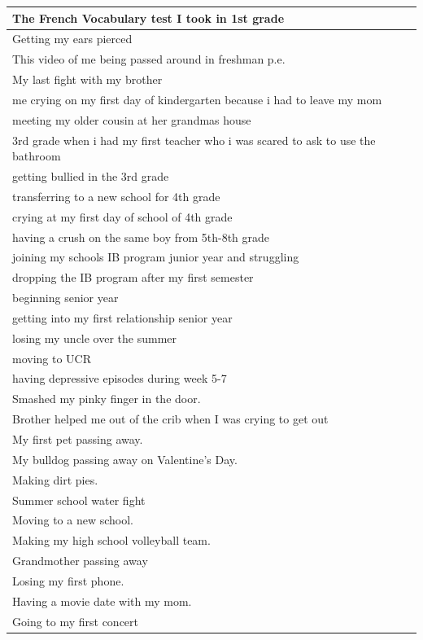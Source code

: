 \documentclass[
  .7em,
  letterpaper,
  DIV=11,
  numbers=noendperiod]{scrartcl}
\begin{document}
\begin{table}
\begin{tabular}{l}
\hline
The French Vocabulary test I took in 1st grade\\
\hline
Getting my ears pierced\\
\hline
This video of me being passed around in freshman p.e.\\
\hline
My last fight with my brother\\
\hline
me crying on my first day of kindergarten because i had to leave my mom\\
\hline
meeting my older cousin at her grandmas house\\
\hline
3rd grade when i had my first teacher who i was scared to ask to use the bathroom\\
\hline
getting bullied in the 3rd grade\\
\hline
transferring to a new school for 4th grade\\
\hline
crying at my first day of school of 4th grade\\
\hline
having a crush on the same boy from 5th-8th grade\\
\hline
joining my schools IB program junior year and struggling\\
\hline
dropping the IB program after my first semester\\
\hline
beginning senior year\\
\hline
getting into my first relationship senior year\\
\hline
losing my uncle over the summer\\
\hline
moving to UCR\\
\hline
having depressive episodes during week 5-7\\
\hline
Smashed my pinky finger in the door.\\
\hline
Brother helped me out of the crib when I was crying to get out\\
\hline
My first pet passing away.\\
\hline
My bulldog passing away on Valentine’s Day.\\
\hline
Making dirt pies.\\
\hline
Summer school water fight\\
\hline
Moving to a new school.\\
\hline
Making my high school volleyball team.\\
\hline
Grandmother passing away\\
\hline
Losing my first phone.\\
\hline
Having a movie date with my mom.\\
\hline
Going to my first concert\\

\end{tabular}
\end{table}
\end{document}
